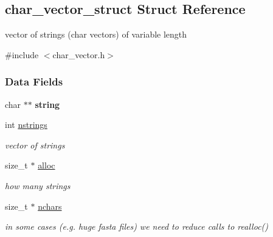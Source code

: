 \hypertarget{structchar__vector__struct}{}\subsection{char\+\_\+vector\+\_\+struct Struct Reference}
\label{structchar__vector__struct}


vector of strings (char vectors) of variable length  




{\ttfamily \#include $<$char\+\_\+vector.\+h$>$}

\subsubsection*{Data Fields}
\begin{DoxyCompactItemize}
\item 
\mbox{\label{structchar__vector__struct_a5e19f16304f812f64f30d88ab643f8e1}} 
char $\ast$$\ast$ {\bfseries string}
\item 
\mbox{\label{structchar__vector__struct_a542bc685f5dc47dd26a75e0e6c74f5f6}} 
int \hyperlink{structchar__vector__struct_a542bc685f5dc47dd26a75e0e6c74f5f6}{nstrings}
\begin{DoxyCompactList}\small\item\em vector of strings \end{DoxyCompactList}\item 
\mbox{\label{structchar__vector__struct_a39397f4d8dec3ecb96bb34929256296f}} 
size\+\_\+t $\ast$ \hyperlink{structchar__vector__struct_a39397f4d8dec3ecb96bb34929256296f}{alloc}
\begin{DoxyCompactList}\small\item\em how many strings \end{DoxyCompactList}\item 
\mbox{\label{structchar__vector__struct_aa5ae13a11f045c77d3cbb6aca95ed09f}} 
size\+\_\+t $\ast$ \hyperlink{structchar__vector__struct_aa5ae13a11f045c77d3cbb6aca95ed09f}{nchars}
\begin{DoxyCompactList}\small\item\em in some cases (e.\+g. huge fasta files) we need to reduce calls to realloc() \end{DoxyCompactList}\item 
$$
\end{DoxyCompactItemize}
